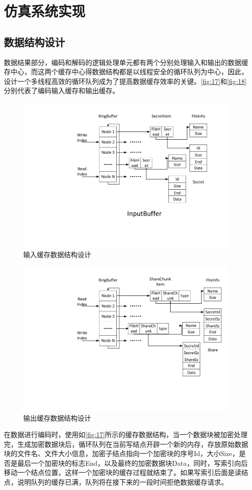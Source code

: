 \section{仿真系统实现}
\subsection{数据结构设计}
数据结果部分，编码和解码的逻辑处理单元都有两个分别处理输入和输出的数据缓存中心，而这两个缓存中心得数据结构都是以线程安全的循环队列为中心，因此，设计一个多线程高效的循环队列成为了提高数据缓存效率的关键。\autoref{fig:17}和\autoref{fig:18}分别代表了编码输入缓存和输出缓存。
\begin{figure}[H]
	\centering
	\includegraphics[width=1\textwidth]{Pics/input-buf.pdf}
	\caption{输入缓存数据结构设计}
	\label{fig:17}
\end{figure}
\begin{figure}[H]
	\centering
	\includegraphics[width=1\textwidth]{Pics/output-buf.pdf}
	\caption{输出缓存数据结构设计}
	\label{fig:18}
\end{figure}
在数据进行编码时，使用如\autoref{fig:17}所示的缓存数据结构，当一个数据块被加密处理完，生成加密数据块后，循环队列在当前写结点开辟一个新的内存，存放原始数据块的文件名、文件大小信息，加密子结点指向一个加密块的序号Id，大小Size，是否是最后一个加密块的标志End，以及最终的加密数据块Data，同时，写索引向后移动一个结点位置，这样一个加密块的缓存过程就结束了。如果写索引后面是读结点，说明队列的缓存已满，队列将在接下来的一段时间拒绝数据缓存请求。


